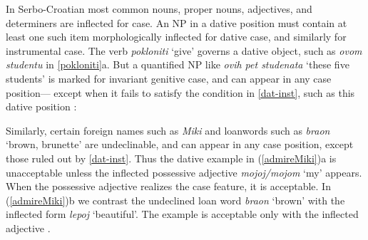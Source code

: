 \documentclass[output=paper
                ,modfonts
                ,nonflat
	        ,collection
	        ,collectionchapter
	        ,collectiontoclongg
 	        ,biblatex
                ,babelshorthands
                ,newtxmath
                ,draftmode
                ,colorlinks, citecolor=brown
]{./langsci/langscibook}
\begin{document}
In Serbo-Croatian most common nouns, proper nouns, adjectives, and determiners are inflected for case.  An NP in a dative position must contain at least one such item morphologically inflected for dative case, and similarly for instrumental case.  The verb {\it pokloniti} `give' governs a dative object, such as \textit{ovom  studentu} in \ref{pokloniti}a.  But a quantified NP like \textit{ovih pet studenata} `these five students' is marked for invariant genitive case, and can appear in any case position--- except when it fails to satisfy the condition in \ref{dat-inst}, such as this dative position \citep[p. 125]{WZ2003a}:

\begin{exe} 
\ex	\label{pokloniti}
\begin{xlist}
\end{xlist}
\end{exe}

\noindent
Similarly, certain foreign names such as \textit{Miki} and loanwords such as {\it braon} `brown, brunette' are undeclinable, and can appear in any case position, except those ruled out by \ref{dat-inst}.  Thus the
dative example in (\ref{admireMiki})a is unacceptable unless the inflected possessive
adjective {\it mojoj/mojom} `my'  appears.   When the possessive adjective realizes the case
feature, it is acceptable.  In  (\ref{admireMiki})b we contrast the undeclined loan word {\it
braon} `brown' with the inflected form {\it lepoj} `beautiful'.  The example is acceptable only
with the inflected adjective \citep[p. 134]{WZ2003a}.


\begin{exe} 
\ex	\label{admireMiki}
\begin{xlist}
\end{xlist}
\end{exe}
\end{document}
